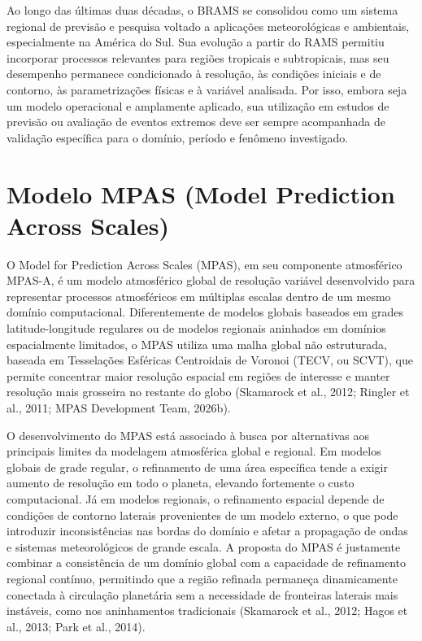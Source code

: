 \documentclass[12pt,a4paper,oneside]{book}
\begin{document}
Ao longo das últimas duas décadas, o BRAMS se consolidou como um sistema regional de previsão e pesquisa voltado a aplicações meteorológicas e ambientais, especialmente na América do Sul. Sua evolução a partir do RAMS permitiu incorporar processos relevantes para regiões tropicais e subtropicais, mas seu desempenho permanece condicionado à resolução, às condições iniciais e de contorno, às parametrizações físicas e à variável analisada. Por isso, embora seja um modelo operacional e amplamente aplicado, sua utilização em estudos de previsão ou avaliação de eventos extremos deve ser sempre acompanhada de validação específica para o domínio, período e fenômeno investigado.

\section{Modelo MPAS (Model Prediction Across Scales)}

O Model for Prediction Across Scales (MPAS), em seu componente atmosférico MPAS-A, é um modelo atmosférico global de resolução variável desenvolvido para representar processos atmosféricos em múltiplas escalas dentro de um mesmo domínio computacional. Diferentemente de modelos globais baseados em grades latitude-longitude regulares ou de modelos regionais aninhados em domínios espacialmente limitados, o MPAS utiliza uma malha global não estruturada, baseada em Tesselações Esféricas Centroidais de Voronoi (TECV, ou SCVT), que permite concentrar maior resolução espacial em regiões de interesse e manter resolução mais grosseira no restante do globo (Skamarock et al., 2012; Ringler et al., 2011; MPAS Development Team, 2026b).

O desenvolvimento do MPAS está associado à busca por alternativas aos principais limites da modelagem atmosférica global e regional. Em modelos globais de grade regular, o refinamento de uma área específica tende a exigir aumento de resolução em todo o planeta, elevando fortemente o custo computacional. Já em modelos regionais, o refinamento espacial depende de condições de contorno laterais provenientes de um modelo externo, o que pode introduzir inconsistências nas bordas do domínio e afetar a propagação de ondas e sistemas meteorológicos de grande escala. A proposta do MPAS é justamente combinar a consistência de um domínio global com a capacidade de refinamento regional contínuo, permitindo que a região refinada permaneça dinamicamente conectada à circulação planetária sem a necessidade de fronteiras laterais mais instáveis, como nos aninhamentos tradicionais (Skamarock et al., 2012; Hagos et al., 2013; Park et al., 2014).
\end{document}
